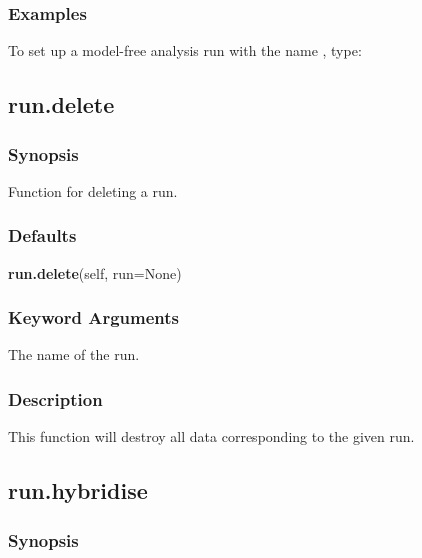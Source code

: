   
 \subsubsection{Examples} 

 To set up a model-free analysis run with the name , type: 
  


  

 \newpage 

 \subsection{run.delete} 

  
 \subsubsection{Synopsis} 

 Function for deleting a run. 
  

  
 \subsubsection{Defaults} 

 \textsf{\textbf{run.delete}(self, run=None)} 

  
 \subsubsection{Keyword Arguments} 

   The name of the run.  

  

  
 \subsubsection{Description} 

 This function will destroy all data corresponding to the given run. 
  

  

 \newpage 

 \subsection{run.hybridise} 

  
 \subsubsection{Synopsis} 

